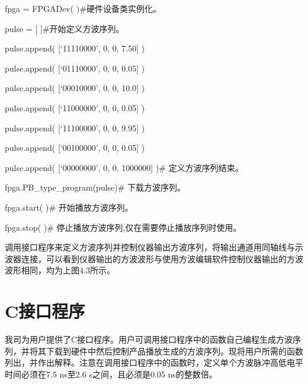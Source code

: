 fpga = FPGADev( )\qquad          \#硬件设备类实例化。

pulse = [{ }{ }]\qquad            \#开始定义方波序列。

%
%
%
%
%
%
%
%
%

pulse.append({ }[`11110000', { }0, { }0, { }7.50]{ })

pulse.append({ }[`01110000', { }0, { }0, { }0.05]{ })

pulse.append({ }[`00010000', { }0, { }0, { }10.0]{ })

pulse.append({ }[`11000000', { }0, { }0, { }0.05]{ })

pulse.append({ }[`11100000', { }0, { }0, { }9.95]{ })

pulse.append({ }[`00100000', { }0, { }0, { }0.05]{ })

pulse.append({ }[`00000000', { }0, { }0, { }1000000]{ })\qquad    \#  定义方波序列结束。

fpga.PB\_type\_program(pulse)\qquad            \#  下载方波序列。

fpga.start( )\qquad          \#  开始播放方波序列。

fpga.stop( )\qquad     \#  停止播放方波序列,仅在需要停止播放序列时使用。

\large
\vspace{0.4cm}
调用接口程序来定义方波序列并控制仪器输出方波序列，将输出通道用同轴线与示波器连接，可以看到仪器输出的方波波形与使用方波编辑软件控制仪器输出的方波波形相同，均为上图4.3所示。

\vspace{0.2cm}
\section{C\heiti 接口程序}
我司为用户提供了C接口程序。用户可调用接口程序中的函数自己编程生成方波序列，并将其下载到硬件中然后控制产品播放生成的方波序列。现将用户所需的函数列出，并作出解释。注意在调用接口程序中的函数时，定义单个方波脉冲高低电平时间必须在7.5 ns至2.6 s之间，且必须是0.05 ns的整数倍。


